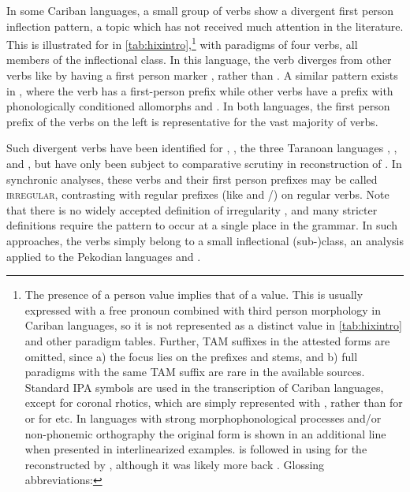 In some Cariban languages, a small group of verbs show a divergent first person inflection pattern, a topic which has not received much attention in the literature.
This is illustrated for \hixka in \cref{tab:hixintro},\footnote{The presence of a  person value implies that of a  value.
This is usually expressed with a free pronoun combined with third person morphology in Cariban languages, so it is not represented as a distinct value in \cref{tab:hixintro} and other paradigm tables.
Further, TAM suffixes in the attested forms are omitted, since a) the focus lies on the prefixes and stems, and b) full paradigms with the same TAM suffix are rare in the available sources.
Standard IPA symbols are used in the transcription of Cariban languages, except for coronal rhotics, which are simply represented with , rather than  for \wayana or  for \maqui etc.
In languages with strong morphophonological processes and/or non-phonemic orthography the original form is shown in an additional line when presented in interlinearized examples.
\textcite{gildea2018reconstructing} is followed in using  for the \PC reconstructed by \textcite{meira2005southern}, although it was likely more back \parencite{gildea2010story}.
Glossing abbreviations: } %
with paradigms of four verbs, all members of the  inflectional class.
In this language, the verb  diverges from other  verbs like  by having a first person marker , rather than .
A similar pattern exists in \trio {}, where the verb  has a first-person prefix  while other  verbs have a prefix with phonologically conditioned allomorphs  and .
In both languages, the first person prefix of the verbs on the left is representative for the vast majority of  verbs.

Such divergent verbs have been identified for \hixka \parencite[188]{hixkaryanaderby1985}, \waiwai \parencite[90]{gildea1998}, the three Taranoan languages \parencite[112--115]{meira1998proto}, \bakairi \parencite{meira2003bakairi}, and \arara \parencite[153]{alves2017arara}, but have only been subject to comparative scrutiny in  reconstruction of \PTar.
In synchronic analyses, these verbs and their first person prefixes may be called \textsc{irregular}, contrasting with regular prefixes (like \hixka {} and \trio {}/) on regular verbs.
Note that there is no widely accepted definition of irregularity \parencite{stolz2012introduction}, and many stricter definitions \parencite[e.g.,][]{haspelmath2010understanding} require the pattern to occur at a single place in the grammar.
In such approaches, the verbs simply belong to a small inflectional (sub-)class, an analysis applied to the Pekodian languages \bakairi and \arara \parencites[4]{meira2003bakairi}[149]{alves2017arara}.

